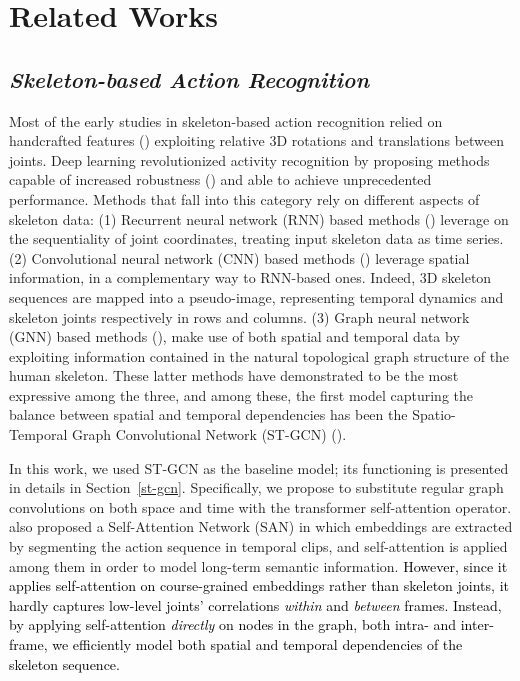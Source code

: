 \documentclass[times,twocolumn,final,authoryear]{elsarticle}
\DeclareRobustCommand{\new}[1]
{{\textcolor{black}{#1}}}
\begin{document}
\section{Related Works}

\subsection{\textit{Skeleton-based Action Recognition}}{Most of the early studies in skeleton-based action recognition relied on handcrafted features (\cite{jointly,points,locations}) exploiting relative 3D rotations and translations between joints. Deep learning revolutionized activity recognition by proposing methods capable of increased robustness (\cite{a-comparative}) and able to achieve unprecedented performance. Methods that fall into this category rely on different aspects of skeleton data: (1) Recurrent neural network (RNN) based methods (\cite{Rnn,modeling,global-context,hrnn}) leverage on the sequentiality of joint coordinates, treating input skeleton data as time series. (2) Convolutional neural network (CNN) based methods (\cite{p-cnn,2s-cnn,investigation,liu2017enhanced,bo}) leverage spatial information, in a complementary way to RNN-based ones. Indeed, 3D skeleton sequences are mapped into a pseudo-image, representing temporal dynamics and skeleton joints respectively in rows and columns. (3) Graph neural network (GNN) based methods (\cite{yan2018spatial,li2019actional,Shi2018TwoStreamAG,dirgraph,shift,disent}), make use of both spatial and temporal data by exploiting information contained in the natural topological graph structure of the human skeleton. These latter methods have demonstrated to be the most expressive among the three, and among these, the first model capturing the balance between spatial and temporal dependencies has been the Spatio-Temporal Graph Convolutional Network (ST-GCN) (\cite{yan2018spatial}). 

In this work, we used ST-GCN as the baseline model; its functioning is presented in details in Section~\ref{st-gcn}. Specifically, we propose to substitute regular graph convolutions on both space and time with the transformer self-attention operator. \cite{san} also proposed a Self-Attention Network (SAN) in which embeddings are extracted by segmenting the action sequence in temporal clips, and self-attention is applied among them in order to model long-term semantic information. \new{However, since it applies self-attention on course-grained embeddings rather than skeleton joints, it hardly captures low-level joints' correlations \textit{within} and \textit{between} frames. Instead, by applying self-attention \textit{directly} on nodes in the graph, both intra- and inter-frame, we efficiently model both spatial and temporal dependencies of the skeleton sequence. } }
\end{document}
